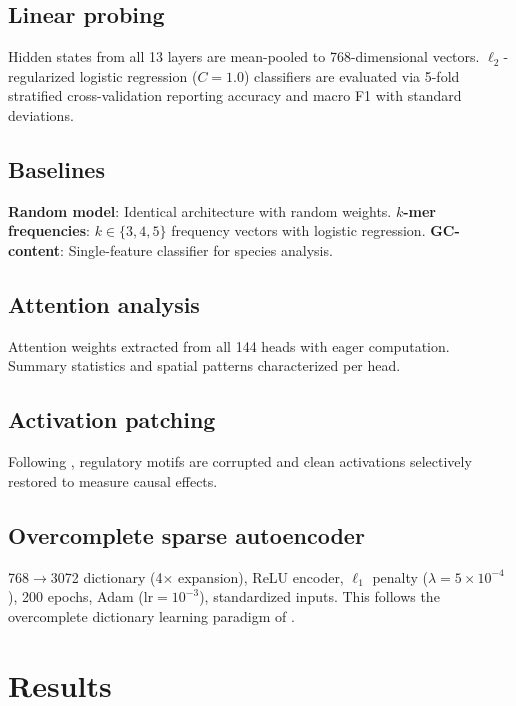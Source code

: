 \documentclass[12pt]{article}
\begin{document}
\subsection{Linear probing}

Hidden states from all 13 layers are mean-pooled to 768-dimensional vectors. $\ell_2$-regularized logistic regression ($C=1.0$) classifiers are evaluated via 5-fold stratified cross-validation reporting accuracy and macro F1 with standard deviations.

\subsection{Baselines}

\textbf{Random model}: Identical architecture with random weights. \textbf{$k$-mer frequencies}: $k \in \{3,4,5\}$ frequency vectors with logistic regression. \textbf{GC-content}: Single-feature classifier for species analysis.

\subsection{Attention analysis}

Attention weights extracted from all 144 heads with eager computation. Summary statistics and spatial patterns characterized per head.

\subsection{Activation patching}

Following \citet{meng2022locating}, regulatory motifs are corrupted and clean activations selectively restored to measure causal effects.

\subsection{Overcomplete sparse autoencoder}

768$\to$3072 dictionary (4$\times$ expansion), ReLU encoder, $\ell_1$ penalty ($\lambda = 5 \times 10^{-4}$), 200 epochs, Adam ($\text{lr}=10^{-3}$), standardized inputs. This follows the overcomplete dictionary learning paradigm of \citet{bricken2023monosemanticity}.

\section{Results}
\end{document}
